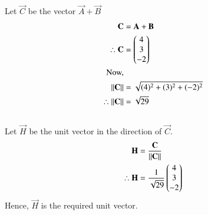 Let $\vec{C}$ be the vector $\vec{A} + \vec{B}$
\begin{align}
    \mathbf{C} &= \mathbf{A} + \mathbf{B} \\
    \therefore \mathbf{C} &= \begin{pmatrix}4\\3\\-2\end{pmatrix}\\
\text{Now,}\notag\\
    \left\lVert\mathbf{C}\right\rVert &= \sqrt{(4)^2 + (3)^2 + (-2)^2}\\
    \therefore \left\lVert\mathbf{C}\right\rVert &= \sqrt{29}
\end{align}
\\Let $\vec{H}$ be the unit vector in the direction of $\vec{C}$.
\begin{align}
    \mathbf{H} &= \dfrac{\mathbf{C}}{\left\lVert\mathbf{C}\right\rVert}\\
    \therefore \mathbf{H} &= \dfrac{1}{\sqrt{29}} \begin{pmatrix}4\\3\\-2\end{pmatrix}
\end{align}
Hence, $\vec{H}$ is the required unit vector.